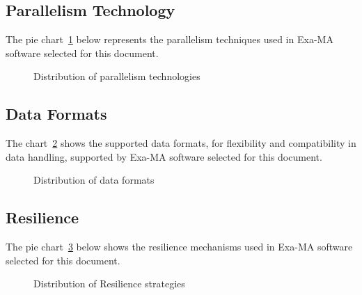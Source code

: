 \subsection{Parallelism Technology}


The pie chart~\ref{fig:parallelism} below represents the parallelism techniques used in Exa-MA software selected for this document.

\begin{figure}[H]
\centering
{}
\caption{Distribution of parallelism technologies}
\label{fig:parallelism}
\end{figure}



\subsection{Data Formats}

The chart~\ref{fig:data} shows the supported data formats, for flexibility and compatibility in data handling, supported by Exa-MA software selected for this document.

\begin{figure}[H]
\centering
{}
\caption{Distribution of data formats}
\label{fig:data}
\end{figure}


\subsection{Resilience}

The pie chart~\ref{fig:resilience} below shows the resilience mechanisms used in Exa-MA software selected for this document.

\begin{figure}[H]
\centering
{}
\caption{Distribution of Resilience strategies}
\label{fig:resilience}
\end{figure}




